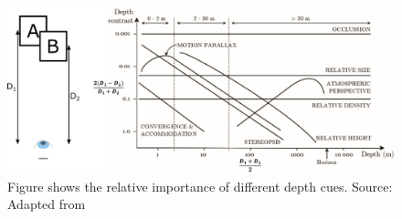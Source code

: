 \begin{figure}[h!]
\centering
\includegraphics[width=0.99\columnwidth]{images/other/cutting_and_vishton}
\caption[Relative importance of depth cues]{Figure shows the relative importance of different depth cues. Source: Adapted from \citet{cutting1995perceiving}}
\label{fig:cutting_and_vishton}
\end{figure}

